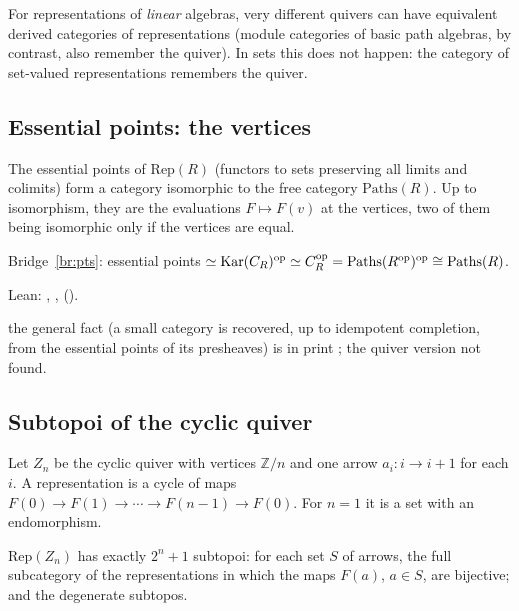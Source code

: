 \inwords{} For representations of \emph{linear} algebras, very different quivers can have equivalent derived categories of representations (module categories of basic path algebras, by contrast, also remember the quiver). In sets this does not happen: the category of set-valued representations remembers the quiver.

\subsection{Essential points: the vertices}

\begin{theorem}\label{th:quiverpoints}
The essential points of $\mathrm{Rep}(R)$ (functors to sets preserving all limits and colimits) form a category isomorphic to the free category $\mathrm{Paths}(R)$. Up to isomorphism, they are the evaluations $F\mapsto F(v)$ at the vertices, two of them being isomorphic only if the vertices are equal.
\end{theorem}

\begin{trace}
\item[arch] Bridge~\ref{br:pts}: essential points $\simeq\operatorname{Kar}(C_R)^{\mathrm{op}}\simeq C_R^{\mathrm{op}} = \mathrm{Paths}(R^{\mathrm{op}})^{\mathrm{op}}\cong\mathrm{Paths}(R)$.
\item[verify] Lean: , ,  ().
\item[novelty] the general fact (a small category is recovered, up to idempotent completion, from the essential points of its presheaves) is in print \cite[\S4.2.1]{rogers-thesis}; the quiver version not found.
\end{trace}

\subsection{Subtopoi of the cyclic quiver}

Let $Z_n$ be the cyclic quiver with vertices $\mathbb Z/n$ and one arrow $a_i : i\to i+1$ for each $i$. A representation is a cycle of maps $F(0)\to F(1)\to\cdots\to F(n-1)\to F(0)$. For $n = 1$ it is a set with an endomorphism.

\begin{theorem}\label{th:cycle}
$\mathrm{Rep}(Z_n)$ has exactly $2^n + 1$ subtopoi: for each set $S$ of arrows, the full subcategory of the representations in which the maps $F(a)$, $a\in S$, are bijective; and the degenerate subtopos.
\end{theorem}

